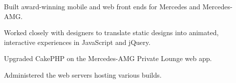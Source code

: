 \documentclass[]{pb-resume-openfonts}
\begin{document}
\begin{tightemize}
\item Built award-winning mobile and web front ends for Mercedes and Mercedes-AMG.
\item Worked closely with designers to translate static designs into animated, interactive experiences in JavaScript and jQuery.
\item Upgraded CakePHP on the Mercedes-AMG Private Lounge web app.
\item Administered the web servers hosting various builds.
\end{tightemize}
\sectionsep
\end{document}
